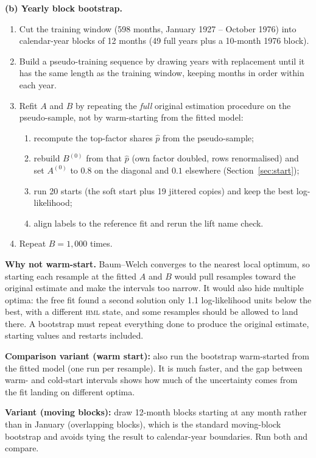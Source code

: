 \documentclass[11pt]{article}
\newcommand{\HML}{\textsc{hml}}
\begin{document}
\textbf{(b) Yearly block bootstrap.}
\begin{enumerate}
\item Cut the training window (598 months, January 1927 -- October 1976) into calendar-year blocks of 12 months (49 full years plus a 10-month 1976 block).
\item Build a pseudo-training sequence by drawing years with replacement until it has the same length as the training window, keeping months in order within each year.
\item Refit $A$ and $B$ by repeating the \emph{full} original estimation procedure on the pseudo-sample, not by warm-starting from the fitted model:
\begin{enumerate}
\item recompute the top-factor shares $\hat p$ from the pseudo-sample;
\item rebuild $B^{(0)}$ from that $\hat p$ (own factor doubled, rows renormalised) and set $A^{(0)}$ to $0.8$ on the diagonal and $0.1$ elsewhere (Section~\ref{sec:start});
\item run 20 starts (the soft start plus 19 jittered copies) and keep the best log-likelihood;
\item align labels to the reference fit and rerun the lift name check.
\end{enumerate}
\item Repeat $B=1{,}000$ times.
\end{enumerate}
\textbf{Why not warm-start.} Baum--Welch converges to the nearest local optimum, so starting each resample at the fitted $A$ and $B$ would pull resamples toward the original estimate and make the intervals too narrow. It would also hide multiple optima: the free fit found a second solution only 1.1 log-likelihood units below the best, with a different \HML{} state, and some resamples should be allowed to land there. A bootstrap must repeat everything done to produce the original estimate, starting values and restarts included.

\textbf{Comparison variant (warm start):} also run the bootstrap warm-started from the fitted model (one run per resample). It is much faster, and the gap between warm- and cold-start intervals shows how much of the uncertainty comes from the fit landing on different optima.

\textbf{Variant (moving blocks):} draw 12-month blocks starting at any month rather than in January (overlapping blocks), which is the standard moving-block bootstrap \citep{kunsch1989,lahiri2003} and avoids tying the result to calendar-year boundaries. Run both and compare.
\end{document}
